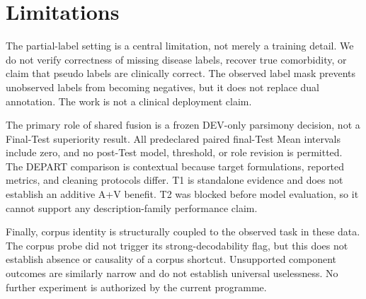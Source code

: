 \section{Limitations}

The partial-label setting is a central limitation, not merely a training detail. We do not verify correctness of missing disease labels, recover true comorbidity, or claim that pseudo labels are clinically correct. The observed label mask prevents unobserved labels from becoming negatives, but it does not replace dual annotation. The work is not a clinical deployment claim.

The primary role of shared fusion is a frozen DEV-only parsimony decision, not a Final-Test superiority result. All predeclared paired final-Test Mean intervals include zero, and no post-Test model, threshold, or role revision is permitted. The DEPART comparison is contextual because target formulations, reported metrics, and cleaning protocols differ. T1 is standalone evidence and does not establish an additive A+V benefit. T2 was blocked before model evaluation, so it cannot support any description-family performance claim.

Finally, corpus identity is structurally coupled to the observed task in these data. The corpus probe did not trigger its strong-decodability flag, but this does not establish absence or causality of a corpus shortcut. Unsupported component outcomes are similarly narrow and do not establish universal uselessness. No further experiment is authorized by the current programme.
